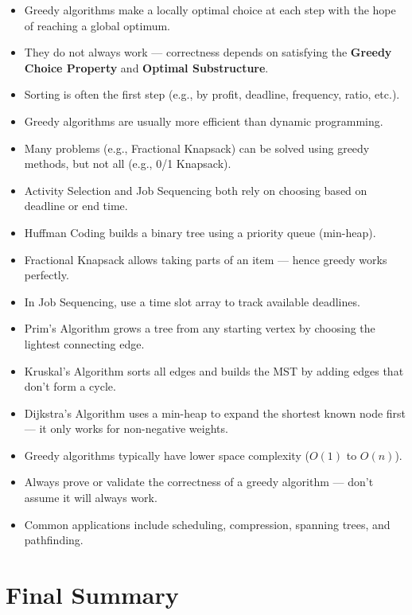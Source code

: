 \documentclass[14pt]{extarticle}
\begin{document}
\begin{itemize}
    \item Greedy algorithms make a locally optimal choice at each step with the hope of reaching a global optimum.
    \item They do not always work — correctness depends on satisfying the \textbf{Greedy Choice Property} and \textbf{Optimal Substructure}.
    \item Sorting is often the first step (e.g., by profit, deadline, frequency, ratio, etc.).
    \item Greedy algorithms are usually more efficient than dynamic programming.
    \item Many problems (e.g., Fractional Knapsack) can be solved using greedy methods, but not all (e.g., 0/1 Knapsack).
    \item Activity Selection and Job Sequencing both rely on choosing based on deadline or end time.
    \item Huffman Coding builds a binary tree using a priority queue (min-heap).
    \item Fractional Knapsack allows taking parts of an item — hence greedy works perfectly.
    \item In Job Sequencing, use a time slot array to track available deadlines.
    \item Prim’s Algorithm grows a tree from any starting vertex by choosing the lightest connecting edge.
    \item Kruskal’s Algorithm sorts all edges and builds the MST by adding edges that don’t form a cycle.
    \item Dijkstra’s Algorithm uses a min-heap to expand the shortest known node first — it only works for non-negative weights.
    \item Greedy algorithms typically have lower space complexity ($O(1)$ to $O(n)$).
    \item Always prove or validate the correctness of a greedy algorithm — don’t assume it will always work.
    \item Common applications include scheduling, compression, spanning trees, and pathfinding.
\end{itemize}

\section*{ Final Summary}
\end{document}
